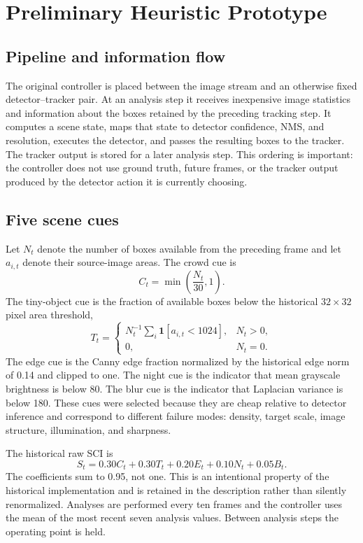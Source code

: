 \section{Preliminary Heuristic Prototype}
\subsection{Pipeline and information flow}
The original controller is placed between the image stream and an otherwise fixed detector--tracker pair. At an analysis step it receives inexpensive image statistics and information about the boxes retained by the preceding tracking step. It computes a scene state, maps that state to detector confidence, NMS, and resolution, executes the detector, and passes the resulting boxes to the tracker. The tracker output is stored for a later analysis step. This ordering is important: the controller does not use ground truth, future frames, or the tracker output produced by the detector action it is currently choosing.

\subsection{Five scene cues}
Let $N_t$ denote the number of boxes available from the preceding frame and let $a_{i,t}$ denote their source-image areas. The crowd cue is
\begin{equation}
C_t=\min\left(\frac{N_t}{30},1\right).
\end{equation}
The tiny-object cue is the fraction of available boxes below the historical $32\times32$ pixel area threshold,
\begin{equation}
T_t=\begin{cases}N_t^{-1}\sum_i\mathbf{1}[a_{i,t}<1024],&N_t>0,\\0,&N_t=0.\end{cases}
\end{equation}
The edge cue is the Canny edge fraction normalized by the historical edge norm of 0.14 and clipped to one. The night cue is the indicator that mean grayscale brightness is below 80. The blur cue is the indicator that Laplacian variance is below 180. These cues were selected because they are cheap relative to detector inference and correspond to different failure modes: density, target scale, image structure, illumination, and sharpness.

The historical raw SCI is
\begin{equation}
S_t=0.30C_t+0.30T_t+0.20E_t+0.10N_t+0.05B_t.
\end{equation}
The coefficients sum to 0.95, not one. This is an intentional property of the historical implementation and is retained in the description rather than silently renormalized. Analyses are performed every ten frames and the controller uses the mean of the most recent seven analysis values. Between analysis steps the operating point is held.


